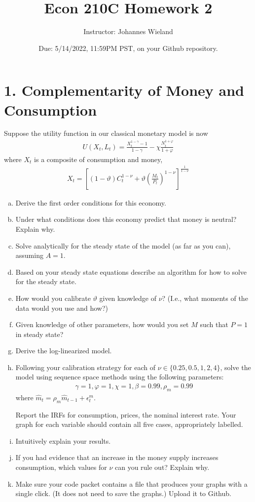 \documentclass{article}
\newcommand{\1}{\mathbf{1}}
\begin{document}
\title{Econ 210C Homework 2}
\author{Instructor: Johannes Wieland}
\date{\color{red} Due: 5/14/2022, 11:59PM PST, on your Github repository.}
\maketitle




\section*{1. Complementarity of Money and Consumption}
Suppose the utility function in our classical monetary model is now
\begin{align*}
	U(X_t,L_t)=\frac{X_t^{1-\gamma}-1}{1-\gamma}-\chi \frac{N_t^{1+\varphi}}{{1+\varphi}}
\end{align*}
where $X_t$ is a composite of consumption and money,
\begin{align*}
	X_t=\left[(1-\vartheta)C_t^{1-\nu}+\vartheta\left(\frac{M_t}{P_t}\right)^{1-\nu}\right]^{\frac{1}{1-\nu}}
\end{align*}
\begin{enumerate}[(a)]
	\item Derive the first order conditions for this economy.
	\item Under what conditions does this economy predict that money is neutral? Explain why.
	\item Solve analytically for the steady state of the model (as far as you can), assuming $A=1$.
	\item Based on your steady state equations describe an algorithm for how to solve for the steady state.
	\item How would you calibrate $\vartheta$ given knowledge of $\nu$? (I.e., what moments of the data would you use and how?)
	\item Given knowledge of other parameters, how would you set $M$ such that $P=1$ in steady state?
	\item Derive the log-linearized model. 
	\item Following your calibration strategy for each of $\nu\in\{0.25,0.5,1,2,4\}$, solve the model using sequence space methods using the following parameters:
	\begin{align*} \gamma=1,\varphi=1,\chi=1,\beta=0.99,\rho_m=0.99
	\end{align*}
	where $\hat{m}_t = \rho_m \hat{m}_{t-1} + \epsilon_t^m$.
	
	Report the IRFs for consumption, prices, the nominal interest rate. Your graph for each variable should contain all five cases, appropriately labelled. 
	\item Intuitively explain your results.
	\item If you had evidence that an increase in the money supply increases consumption, which values for $\nu$ can you rule out? Explain why.
	\item Make sure your code packet contains a file that produces your graphs with a single click. (It does not need to save the graphs.) Upload it to Github.
\end{enumerate}
\end{document}
